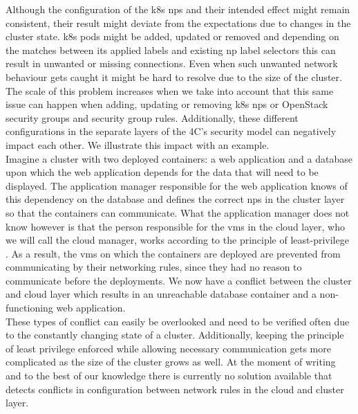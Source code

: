 Although the configuration of the \acrshort{k8s} \acrshort{np}s and their intended effect might remain consistent, their result might deviate from the expectations due to changes in the cluster state. \acrshort{k8s} pods might be added, updated or removed and depending on the matches between its applied labels and existing \acrshort{np} label selectors this can result in unwanted or missing connections. Even when such unwanted network behaviour gets caught it might be hard to resolve due to the size of the cluster. The scale of this problem increases when we take into account that this same issue can happen when adding, updating or removing \acrshort{k8s} \acrshort{np}s or OpenStack security groups and security group rules. Additionally, these different configurations in the separate layers of the 4C's security model can negatively impact each other. We illustrate this impact with an example.
\\[10pt]

Imagine a cluster with two deployed containers: a web application and a database upon which the web application depends for the data that will need to be displayed. The application manager responsible for the web application knows of this dependency on the database and defines the correct \acrshort{np}s in the cluster layer so that the containers can communicate. What the application manager does not know however is that the person responsible for the \acrshort{vm}s in the cloud layer, who we will call the cloud manager, works according to the principle of least-privilege \cite{leastprivilige}. As a result, the \acrshort{vm}s on which the containers are deployed are prevented from communicating by their networking rules, since they had no reason to communicate before the deployments. We now have a conflict between the cluster and cloud layer which results in an unreachable database container and a non-functioning web application.
\\[10pt]

These types of conflict can easily be overlooked and need to be verified often due to the constantly changing state of a cluster. Additionally, keeping the principle of least privilege enforced while allowing necessary communication gets more complicated as the size of the cluster grows as well. At the moment of writing and to the best of our knowledge there is currently no solution available that detects conflicts in configuration between network rules in the cloud and cluster layer.
\\[10pt]

